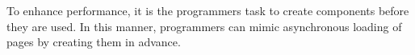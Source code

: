 \documentclass[a4paper]{article}
\newcommand{\term}[1]{\emph{#1}}
\newcommand{\code}[1]{\texttt{#1}}
\begin{document}
To enhance performance,  it is the programmers task to create components before they are used.  In this manner,  programmers can mimic asynchronous loading of pages by creating them in advance.

% 
% 

% 
% 
\end{document}
